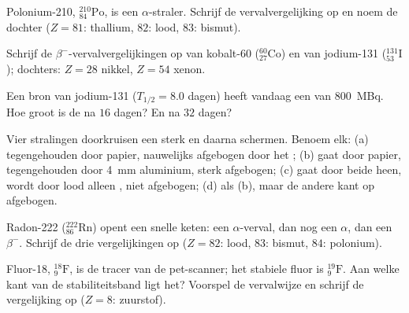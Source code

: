 \begin{exercise}[$\star$]\label{exo:g11:nucleus-radioactivity:3}
Polonium-210, ${}^{210}_{84}\mathrm{Po}$, is een $\alpha$-straler. Schrijf
de vervalvergelijking op en noem de dochter ($Z = 81$: thallium, $82$:
lood, $83$: bismut).
\end{exercise}

\begin{exercise}[$\star$]\label{exo:g11:nucleus-radioactivity:4}
Schrijf de $\beta^-$-vervalvergelijkingen op van kobalt-60
(${}^{60}_{27}\mathrm{Co}$) en van jodium-131
(${}^{131}_{53}\mathrm{I}$); dochters: $Z = 28$ nikkel, $Z = 54$ xenon.
\end{exercise}

\begin{exercise}[$\star$]\label{exo:g11:nucleus-radioactivity:5}
Een bron van jodium-131 ($T_{1/2} = 8.0$ dagen) heeft vandaag een
 van \qty{800}{MBq}. Hoe groot is de  na $16$ dagen?
En na $32$ dagen?
\end{exercise}

\begin{exercise}[$\star\star$]\label{exo:g11:nucleus-radioactivity:6}
Vier stralingen doorkruisen een sterk  en daarna schermen.
Benoem elk: (a) tegengehouden door papier, nauwelijks afgebogen door het
; (b) gaat door papier, tegengehouden door \qty{4}{mm} aluminium,
sterk afgebogen; (c) gaat door beide heen, wordt door lood alleen
, niet afgebogen; (d) als (b), maar de andere kant op afgebogen.
\end{exercise}

\begin{exercise}[$\star\star$]\label{exo:g11:nucleus-radioactivity:7}
Radon-222 (${}^{222}_{86}\mathrm{Rn}$) opent een snelle keten: een
$\alpha$-verval, dan nog een $\alpha$, dan een $\beta^-$. Schrijf de drie
vergelijkingen op ($Z = 82$: lood, $83$: bismut, $84$: polonium).
\end{exercise}

\begin{exercise}[$\star\star$]\label{exo:g11:nucleus-radioactivity:8}
Fluor-18, ${}^{18}_{9}\mathrm{F}$, is de tracer van de pet-scanner; het
stabiele fluor is ${}^{19}_{9}\mathrm{F}$. Aan welke kant van de
stabiliteitsband ligt het? Voorspel de vervalwijze en schrijf de
vergelijking op ($Z = 8$: zuurstof).
\end{exercise}

